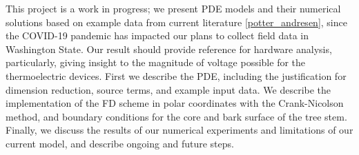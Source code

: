 \documentclass{IEEEtran} %
\newenvironment{bluep}{\par\color{blue}}{\par}
\begin{document}
\begin{bluep}
This project is a work in progress; we present PDE models and their numerical solutions based on example data from current literature \ref{potter_andresen}, since the COVID-19 pandemic has impacted our plans to collect field data in Washington State. Our result should provide reference for hardware analysis, particularly, giving insight to the magnitude of voltage possible for the thermoelectric devices. First we describe the PDE, including the justification for dimension reduction, source terms, and example input data. We describe the implementation of the FD scheme in polar coordinates with the Crank-Nicolson method, and boundary conditions for the core and bark surface of the tree stem. Finally, we discuss the results of our numerical experiments and limitations of our current model, and describe ongoing and future steps.\end{bluep} 



 
\end{document}
